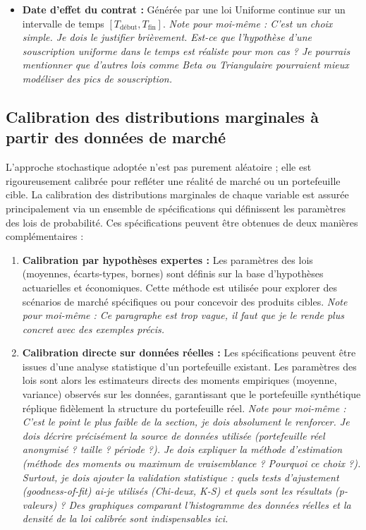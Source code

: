 \begin{itemize}
    \item \textbf{Date d'effet du contrat :} Générée par une loi Uniforme continue sur un intervalle de temps $[T_{\text{début}}, T_{\text{fin}}]$. \textit{Note pour moi-même : C'est un choix simple. Je dois le justifier brièvement. Est-ce que l'hypothèse d'une souscription uniforme dans le temps est réaliste pour mon cas ? Je pourrais mentionner que d'autres lois comme Beta ou Triangulaire pourraient mieux modéliser des pics de souscription.}
\end{itemize}

\subsection{Calibration des distributions marginales à partir des données de marché}

L'approche stochastique adoptée n'est pas purement aléatoire ; elle est rigoureusement calibrée pour refléter une réalité de marché ou un portefeuille cible. La calibration des distributions marginales de chaque variable est assurée principalement via un ensemble de spécifications qui définissent les paramètres des lois de probabilité. Ces spécifications peuvent être obtenues de deux manières complémentaires :
\begin{enumerate}
    \item \textbf{Calibration par hypothèses expertes :} Les paramètres des lois (moyennes, écarts-types, bornes) sont définis sur la base d'hypothèses actuarielles et économiques. Cette méthode est utilisée pour explorer des scénarios de marché spécifiques ou pour concevoir des produits cibles. \textit{Note pour moi-même : Ce paragraphe est trop vague, il faut que je le rende plus concret avec des exemples précis.}
    \item \textbf{Calibration directe sur données réelles :} Les spécifications peuvent être issues d'une analyse statistique d'un portefeuille existant. Les paramètres des lois sont alors les estimateurs directs des moments empiriques (moyenne, variance) observés sur les données, garantissant que le portefeuille synthétique réplique fidèlement la structure du portefeuille réel. \textit{Note pour moi-même : C'est le point le plus faible de la section, je dois absolument le renforcer. Je dois décrire précisément la source de données utilisée (portefeuille réel anonymisé ? taille ? période ?). Je dois expliquer la méthode d'estimation (méthode des moments ou maximum de vraisemblance ? Pourquoi ce choix ?). Surtout, je dois ajouter la validation statistique : quels tests d'ajustement (goodness-of-fit) ai-je utilisés (Chi-deux, K-S) et quels sont les résultats (p-valeurs) ? Des graphiques comparant l'histogramme des données réelles et la densité de la loi calibrée sont indispensables ici.}
\end{enumerate}

